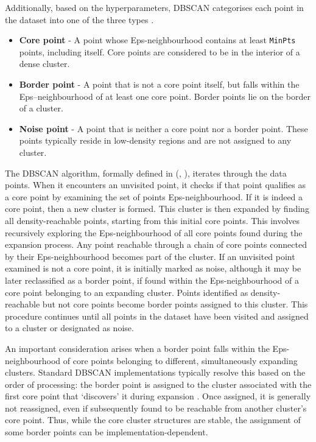 \documentclass[10pt,oneside]{report}
\renewcommand{\citet}[1]{\citeauthor{#1}, \citeyear{#1}}
\begin{document}
Additionally, based on the hyperparameters, DBSCAN categorises each point in the dataset into one of the three types \cite{ester1996density}. 
\begin{itemize}
    \item \textbf{Core point} - A point whose Eps-neighbourhood contains at least \texttt{MinPts} points, including itself. Core points are considered to be in the interior of a dense cluster.
    \item \textbf{Border point} - A point that is not a core point itself, but falls within the Eps--neighbourhood of at least one core point. Border points lie on the border of a cluster.
    \item \textbf{Noise point} - A point that is neither a core point nor a border point. These points typically reside in low-density regions and are not assigned to any cluster.
\end{itemize}

The DBSCAN algorithm, formally defined in (\citet{ester1996density}), iterates through the data points. When it encounters an unvisited point, it checks if that point qualifies as a core point by examining the set of points Eps-neighbourhood. If it is indeed a core point, then a new cluster is formed. This cluster is then expanded by finding all density-reachable points, starting from this initial core points. This involves recursively exploring the Eps-neighbourhood of all core points found during the expansion process. Any point reachable through a chain of core points connected by their Eps-neighbourhood becomes part of the cluster. If an unvisited point examined is not a core point, it is initially marked as noise, although it may be later reclassified as a border point, if found within the Eps-neighbourhood of a core point belonging to an expanding cluster. Points identified as density-reachable but not core points become border points assigned to this cluster. This procedure continues until all points in the dataset have been visited and assigned to a cluster or designated as noise.

An important consideration arises when a border point falls within the Eps-neighbourhood of core points belonging to different, simultaneously expanding clusters. Standard DBSCAN implementations typically resolve this based on the order of processing: the border point is assigned to the cluster associated with the first core point that `discovers' it during expansion \cite{ester1996density}. Once assigned, it is generally not reassigned, even if subsequently found to be reachable from another cluster's core point. Thus, while the core cluster structures are stable, the assignment of some border points can be implementation-dependent.
\end{document}

